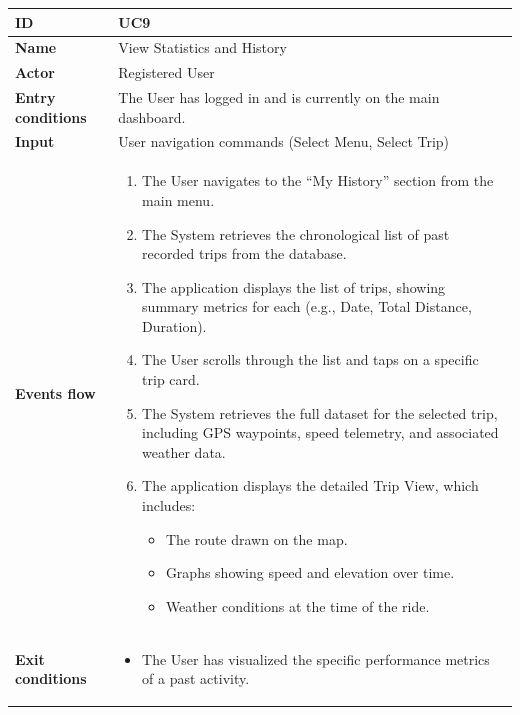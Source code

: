 \begin{table}[H]
\centering
\begin{tabularx}{\textwidth}{|m{3.5cm}|X|}
\hline
\textbf{ID} & UC9 \\ \hline
\textbf{Name} & View Statistics and History \\ \hline
\textbf{Actor} & Registered User \\ \hline
\textbf{Entry conditions} & The User has logged in and is currently on the main dashboard. \\ \hline
\textbf{Input} & User navigation commands (Select Menu, Select Trip) \\ \hline
\textbf{Events flow} & 
    \begin{enumerate}[nosep, leftmargin=*, before=\vspace{0.3em}, after=\vspace{0.3em}]
        \item The User navigates to the ``My History'' section from the main menu.
        \item The System retrieves the chronological list of past recorded trips from the database.
        \item The application displays the list of trips, showing summary metrics for each (e.g., Date, Total Distance, Duration).
        \item The User scrolls through the list and taps on a specific trip card.
        \item The System retrieves the full dataset for the selected trip, including GPS waypoints, speed telemetry, and associated weather data.
        \item The application displays the detailed Trip View, which includes:
            \begin{itemize}[nosep, leftmargin=*]
                \item The route drawn on the map.
                \item Graphs showing speed and elevation over time.
                \item Weather conditions at the time of the ride.
            \end{itemize}
    \end{enumerate} 
    \\ \hline
\textbf{Exit conditions} & 
    \begin{itemize}[nosep, leftmargin=*, before=\vspace{0.3em}, after=\vspace{0.3em}]
        \item The User has visualized the specific performance metrics of a past activity.

\end{itemize}
\end{tabularx}
\end{table}
